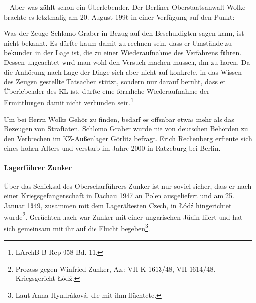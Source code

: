 \documentclass[a4paper,12pt,ngerman,
]{nisebook}
\begin{document}
~\newline
Aber was zählt schon ein Überlebender. Der Berliner Oberstaatsanwalt Wolke brachte es letztmalig am 20. August 1996 in einer Verfügung auf den Punkt:
\begin{leftbar} 
Was der Zeuge Schlomo Graber in Bezug auf den Beschuldigten sagen kann, ist nicht bekannt. Es dürfte kaum damit zu rechnen sein, dass er Umstände zu bekunden in der Lage ist, die zu einer Wiederaufnahme des Verfahrens führen. Dessen ungeachtet wird man wohl den Versuch machen müssen, ihn zu hören. Da die Anhörung nach Lage der Dinge sich aber nicht auf konkrete, in das Wissen des Zeugen gestellte Tatsachen stützt, sondern nur darauf beruht, dass er Überlebender des KL ist, dürfte eine förmliche Wiederaufnahme der Ermittlungen damit nicht verbunden sein.\footnote{LArchB B Rep 058 Bd. 11.}
\end{leftbar}
\newpage
Um bei Herrn Wolke Gehör zu finden, bedarf es offenbar etwas mehr als das Bezeugen von Straftaten. Schlomo Graber wurde nie von deutschen Behörden zu den Verbrechen im KZ-Außenlager Görlitz befragt. Erich Rechenberg erfreute sich eines hohen Alters und verstarb im Jahre 2000 in Ratzeburg bei Berlin.


\paragraph{Lagerführer Zunker\label{zunker_ahndung}}
Über das Schicksal des Oberscharführers Zunker ist nur soviel sicher, dass er nach einer Kriegsgefangenschaft in Dachau 1947 an Polen ausgeliefert und am 25. Januar 1949, zusammen mit dem Lagerältesten Czech, in \L \'od\'z hingerichtet wurde\footnote{Prozess gegen Winfried Zunker, Az.: VII K 1613/48, VII 1614/48. Kriegsgericht \L \'od\'z.}.
Gerüchten nach war Zunker mit einer ungarischen Jüdin liiert und hat sich gemeinsam mit ihr auf die Flucht begeben\footnote{Laut Anna Hyndr\'akov\'a, die mit ihm flüchtete.}.
\end{document}
